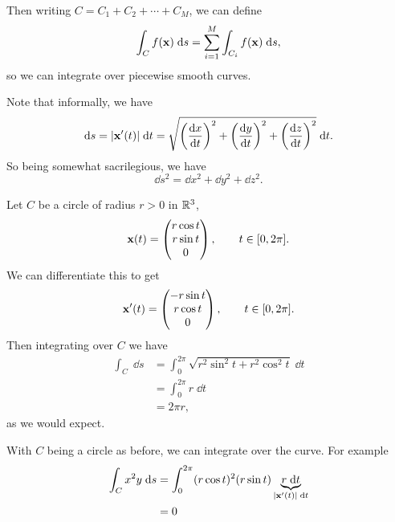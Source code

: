 \documentclass[a4paper]{scrreprt}
\begin{document}
\begin{center}

\end{center}

Then writing $C = C_1 + C_2 + \cdots + C_M$, we can define
$$
\int_C f(\mathbf{x}) \; \mathrm{d} s = \sum_{i = 1}^M \int_{C_i} f(\mathbf{x}) \; \mathrm{d} s,
$$
so we can integrate over piecewise smooth curves.

Note that informally, we have 
$$\mathrm{d} s = |\mathbf{x}'(t)| \; \mathrm{d} t = \sqrt{\left(\frac{\mathrm{d} x}{\mathrm{d} t}\right)^2 + \left(\frac{\mathrm{d} y}{\mathrm{d} t}\right)^2 + \left(\frac{\mathrm{d} z}{\mathrm{d} t}\right)^2} \; \mathrm{d} t.$$
So being somewhat sacrilegious, we have
$$
\dd s^2 = \dd x^2 + \dd y^2 + \dd z^2.
$$

\begin{example}
	Let $C$ be a circle of radius $r > 0$ in $\mathbb{R}^3$,
	$$
	\mathbf{x}(t) = \begin{pmatrix}
		r \cos t \\
		r \sin t \\
		0
	\end{pmatrix}, \quad \quad t \in [0, 2 \pi].
	$$
	We can differentiate this to get 
	$$
	\mathbf{x}'(t) = \begin{pmatrix}
		-r \sin t \\
		r \cos t \\
		0
	\end{pmatrix}, \quad \quad t \in [0, 2 \pi].
	$$
	Then integrating over $C$ we have
	\begin{align*}
		\int_C \; \dd s &= \int_0^{2 \pi} \sqrt{r^2 \sin^2 t + r^2 \cos^2 t} \; \dd t\\
		&= \int_0^{2 \pi} r \; \dd t \\
		&= 2 \pi r,
	\end{align*}
	as we would expect.
\end{example}

\begin{example}
	With $C$ being a circle as before, we can integrate over the curve. For example
	\begin{align*}
		\int_C x^2 y \; \mathrm{d} s &= \int_0^{2 \pi} (r \cos t)^2 (r \sin t) \underbrace{r \; \mathrm{d} t}_{|\mathbf{x}'(t)| \; \mathrm{d} t} \\
		&= 0
	\end{align*}
\end{example}
\end{document}
